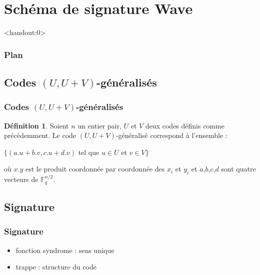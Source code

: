 \documentclass[10pt,a4paper]{beamer}
\theoremstyle{plain}
\theoremstyle{definition}
\newtheorem{defi}[thm]{Définition}
\newcommand{\F}{\mathbb{F}}
\begin{document}
\section{Schéma de signature Wave}
\begin{frame}<handout:0>
  \frametitle{Plan}
  \tableofcontents[currentsection,subsectionstyle=hide]
\end{frame}

\subsection{Codes $(U,U+V)$-généralisés}

\begin{frame}
\frametitle{Codes $(U,U+V)$-généralisés}
\begin{defi} 

\noindent Soient $n$ un entier pair, $U$ et $V$ deux codes définis comme précédemment. Le code $(U,U+V)$-généralisé correspond à l'ensemble :
\begin{center}
$\{(a.u + b.v, c.u + d.v)$ tel que $u \in U$ et $v \in V \}$
\end{center}
où $x.y$ est le produit coordonnée par coordonnée des $x_i$ et $y_i$ et $a$,$b$,$c$,$d$ sont quatre vecteurs de $\F_q^{n/2}$.\\
\end{defi}
\end{frame}


\subsection{Signature}

\begin{frame}
\frametitle{Signature}
\begin{itemize}
\item fonction syndrome : sens unique
\item trappe : structure du code
\end{itemize}
\end{frame}
\end{document}
